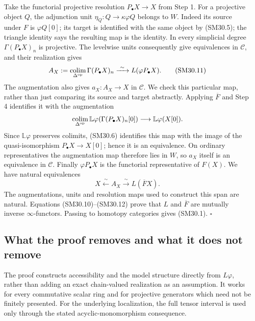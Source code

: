 \documentclass[11pt,a4paper]{article}
\theoremstyle{definition}\newtheorem{definition}[theorem]{Definition}
\theoremstyle{remark}\newtheorem{remark}[theorem]{Remark}
\begin{document}
Take the functorial projective resolution \(P_\bullet X\to X\)
from Step 1.  For a projective object \(Q\), the adjunction
unit \(\eta_Q:Q\to\kappa\varphi Q\) belongs to \(W\).
Indeed its source under \(F\) is \(\varphi Q[0]\); its
target is identified with the same object by (SM30.5); the
triangle identity says the resulting map is the identity.
In every simplicial degree \(\Gamma(P_\bullet X)_n\) is
projective.  The levelwise units consequently give equivalences
in \(\mathcal C\), and their realization gives
\[
 A_X:=\operatorname*{colim}_{\Delta^{\rm op}}
                    \Gamma(P_\bullet X)_n
       \xrightarrow{\ \sim\ }L(\varphi P_\bullet X).
                                                               \tag{SM30.11}
\]
The augmentation also gives \(a_X:A_X\to X\) in \(\mathcal C\).
We check this particular map, rather than just comparing its
source and target abstractly.  Applying \(\overline F\) and
Step 4 identifies it with the augmentation
\[
 \operatorname*{colim}_{\Delta^{\rm op}}
       \mathbb L\varphi(\Gamma(P_\bullet X)_n[0])
                   \longrightarrow\mathbb L\varphi(X[0]).
\]
Since \(\mathbb L\varphi\) preserves colimits, (SM30.6)
identifies this map with the image of the quasi-isomorphism
\(P_\bullet X\to X[0]\); hence it is an equivalence.
On ordinary representatives the augmentation map therefore
lies in \(W\), so \(a_X\) itself is an equivalence in
\(\mathcal C\).  Finally \(\varphi P_\bullet X\) is the
functorial representative of \(F(X)\).  We have natural
equivalences
\[
              X\xleftarrow{\ \sim\ } A_X
                    \xrightarrow{\ \sim\ }L(\overline F X).
                                                               \tag{SM30.12}
\]
The augmentations, units and resolution maps used to construct
this span are natural.  Equations (SM30.10)--(SM30.12) prove
that \(L\) and \(\overline F\) are mutually inverse
\(\infty\)-functors.  Passing to homotopy categories gives
(SM30.1). \(\square\)

\subsection{What the proof removes and what it does not remove}
The proof constructs accessibility and the model structure
directly from \(L\varphi\), rather than adding an exact
chain-valued realization as an assumption.  It works for every
commutative scalar ring and for projective generators which
need not be finitely presented.  For the underlying localization,
the full tensor interval is used only through the stated
acyclic-monomorphism consequence.
\end{document}

